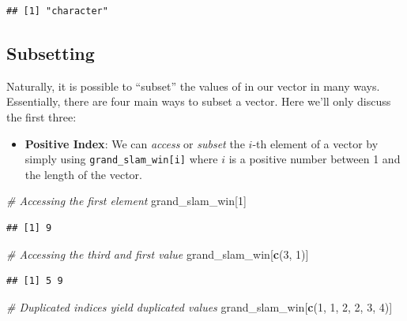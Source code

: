 \documentclass[12pt,]{krantz}
\newenvironment{Shaded}{\begin{snugshade}}{\end{snugshade}}
\newcommand{\KeywordTok}[1]{\textcolor[rgb]{0.27,0.27,0.27}{\textbf{#1}}}
\newcommand{\DecValTok}[1]{\textcolor[rgb]{0.06,0.06,0.06}{#1}}
\newcommand{\CommentTok}[1]{\textcolor[rgb]{0.37,0.37,0.37}{\textit{#1}}}
\newcommand{\NormalTok}[1]{#1}
\providecommand{\tightlist}{%
  \setlength{\itemsep}{0pt}\setlength{\parskip}{0pt}}
\begin{document}
\begin{verbatim}
## [1] "character"
\end{verbatim}

\subsection{Subsetting}\label{subsetting}

Naturally, it is possible to ``subset'' the values of in our vector in
many ways. Essentially, there are four main ways to subset a vector.
Here we'll only discuss the first three:

\begin{itemize}
\tightlist
\item
  \textbf{Positive Index}: We can \emph{access} or \emph{subset} the
  \(i\)-th element of a vector by simply using
  \texttt{grand\_slam\_win{[}i{]}} where \(i\) is a positive number
  between 1 and the length of the vector.
\end{itemize}

\begin{Shaded}
\begin{Highlighting}[]
\CommentTok{# Accessing the first element}
\NormalTok{grand_slam_win[}\DecValTok{1}\NormalTok{]}
\end{Highlighting}
\end{Shaded}

\begin{verbatim}
## [1] 9
\end{verbatim}

\begin{Shaded}
\begin{Highlighting}[]
\CommentTok{# Accessing the third and first value}
\NormalTok{grand_slam_win[}\KeywordTok{c}\NormalTok{(}\DecValTok{3}\NormalTok{, }\DecValTok{1}\NormalTok{)]}
\end{Highlighting}
\end{Shaded}

\begin{verbatim}
## [1] 5 9
\end{verbatim}

\begin{Shaded}
\begin{Highlighting}[]
\CommentTok{# Duplicated indices yield duplicated values}
\NormalTok{grand_slam_win[}\KeywordTok{c}\NormalTok{(}\DecValTok{1}\NormalTok{, }\DecValTok{1}\NormalTok{, }\DecValTok{2}\NormalTok{, }\DecValTok{2}\NormalTok{, }\DecValTok{3}\NormalTok{, }\DecValTok{4}\NormalTok{)]}
\end{Highlighting}
\end{Shaded}
\end{document}
